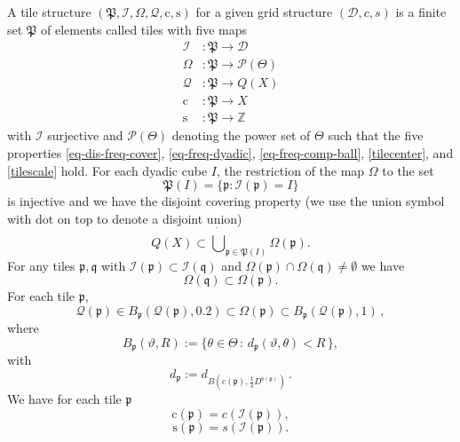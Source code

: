 \documentclass[12pt]{amsart}
\theoremstyle{definition}
\theoremstyle{plain}
\newcommand{\pc}{{\mathrm{c}}}
\newcommand{\ps}{{\mathrm{s}}}
\newcommand{\fc}{{\Omega}}
\newcommand{\scI}{{\mathcal{I}}} %
\newcommand{\tQ}{{Q}}
\newcommand{\mfa}{{\vartheta}}
\newcommand{\mfb}{{\theta}}
\newcommand{\Mf}{{\Theta}}
\newcommand{\fcc}{{\mathcal{Q}}}
\newcommand{\fp}{{\mathfrak p}}
\newcommand{\fP}{{\mathfrak P}}
\newcommand{\fq}{{\mathfrak q}}
\begin{document}
A tile structure $(\fP,\scI,\fc,\fcc,\pc,\ps)$
for a given grid structure $(\mathcal{D}, c, s)$
is a finite set $\fP$ of elements called tiles with five maps
\begin{align*}
    \scI&\colon \fP\to {\mathcal{D}}\\
    \fc&\colon \fP\to \mathcal{P}(\Mf) \\
    \fcc &\colon \fP\to \tQ(X)\\
    \pc &\colon \fP\to X\\
    \ps &\colon \fP\to \mathbb{Z}
\end{align*}
with $\scI$ surjective and $\mathcal{P}(\Mf)$ denoting the power set of $\Mf$ such that the five properties \eqref{eq-dis-freq-cover}, \eqref{eq-freq-dyadic},
\eqref{eq-freq-comp-ball}, \eqref{tilecenter}, and
\eqref{tilescale} hold.
For each dyadic cube $I$, the restriction of the map $\Omega$ to the set
\begin{equation}\label{injective}
    \fP(I)=\{\fp: \scI(\fp) =I\}
\end{equation}
is injective
and we have the disjoint covering property (we use the union symbol with dot on top to denote a disjoint union)
\begin{equation}\label{eq-dis-freq-cover}
    \tQ(X)\subset \dot{\bigcup}_{\fp\in \fP(I)}\fc(\fp).
\end{equation}
For any tiles $\fp,\fq$ with $\scI(\fp)\subset \scI(\fq)$ and $\fc(\fp) \cap \fc(\fq) \neq \emptyset$ we have
\begin{equation} \label{eq-freq-dyadic}
    \fc(\fq)\subset \fc(\fp) .
\end{equation}
For each tile $\fp$,
\begin{equation}\label{eq-freq-comp-ball}
    \fcc(\fp)\in B_{\fp}(\fcc(\fp), 0.2) \subset \fc(\fp) \subset B_{\fp}(\fcc(\fp),1)\,,
\end{equation}
where
\begin{equation}
    B_{\fp} (\mfa, R) := \{\mfb \in \Mf \, : \, d_{\fp}(\mfa, \mfb) < R\,\} ,
\end{equation}
with
\begin{equation}\label{defdp}
    d_{\fp} := d_{B(\pc(\fp),\frac 14 D^{\ps(\fp)})}\, .
\end{equation}
We have for each tile $\fp$
\begin{equation}\label{tilecenter}
    \pc(\fp)=c(\scI(\fp)),
\end{equation}
\begin{equation}\label{tilescale}
    \ps(\fp)=s(\scI(\fp)).
\end{equation}
\end{document}
